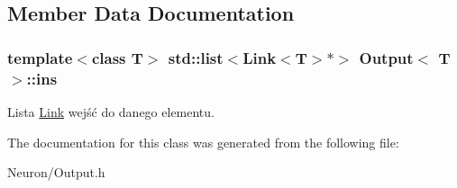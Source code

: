 \subsection{\-Member \-Data \-Documentation}
\hypertarget{class_output_ade68e41659b12f8a7e31f8dc8507bb50}{
\subsubsection[{ins}]{\setlength{\rightskip}{0pt plus 5cm}template$<$class \-T$>$ std\-::list$<${\bf \-Link}$<$\-T$>$$\ast$$>$ {\bf \-Output}$<$ \-T $>$\-::{\bf ins}}}\label{class_output_ade68e41659b12f8a7e31f8dc8507bb50}
\-Lista \hyperlink{class_link}{\-Link} wejść do danego elementu. 

\-The documentation for this class was generated from the following file\-:\begin{DoxyCompactItemize}
\item 
\-Neuron/\-Output.\-h\end{DoxyCompactItemize}
